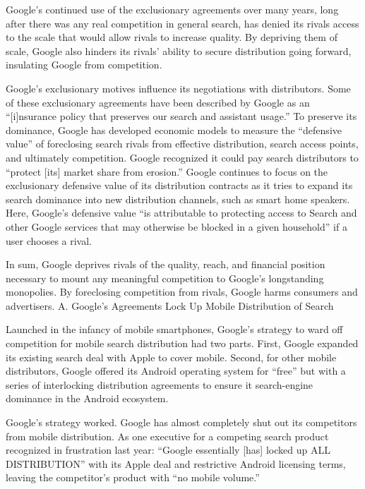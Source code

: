 \documentclass[11pt,b5paper]{scrartcl}
\begin{document}

Google’s continued use of the exclusionary agreements over many years, long
after there was any real competition in general search, has denied its rivals access to the scale
that would allow rivals to increase quality. By depriving them of scale, Google also hinders its
rivals’ ability to secure distribution going forward, insulating Google from competition.


Google’s exclusionary motives influence its negotiations with distributors. Some
of these exclusionary agreements have been described by Google as an “[i]nsurance policy that
preserves our search and assistant usage.” To preserve its dominance, Google has developed
economic models to measure the “defensive value” of foreclosing search rivals from effective
distribution, search access points, and ultimately competition. Google recognized it could pay
search distributors to “protect [its] market share from erosion.” Google continues to focus on the
exclusionary defensive value of its distribution contracts as it tries to expand its search
dominance into new distribution channels, such as smart home speakers. Here, Google’s
defensive value “is attributable to protecting access to Search and other Google services that may
otherwise be blocked in a given household” if a user chooses a rival.


In sum, Google deprives rivals of the quality, reach, and financial position
necessary to mount any meaningful competition to Google’s longstanding monopolies. By
foreclosing competition from rivals, Google harms consumers and advertisers.
A.
Google’s Agreements Lock Up Mobile Distribution of Search


Launched in the infancy of mobile smartphones, Google’s strategy to ward off
competition for mobile search distribution had two parts. First, Google expanded its existing
search deal with Apple to cover mobile. Second, for other mobile distributors, Google offered its
Android operating system for “free” but with a series of interlocking distribution agreements to
ensure it search-engine dominance in the Android ecosystem.


Google’s strategy worked. Google has almost completely shut out its competitors
from mobile distribution. As one executive for a competing search product recognized in
frustration last year: “Google essentially [has] locked up ALL DISTRIBUTION” with its Apple
deal and restrictive Android licensing terms, leaving the competitor’s product with “no mobile
volume.”
\end{document}
